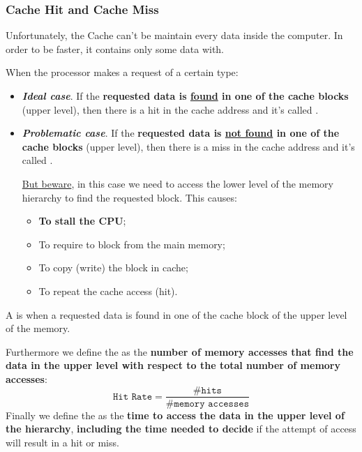\subsubsection{Cache Hit and Cache Miss}

Unfortunately, the Cache can't be maintain every data inside the computer. In order to be faster, it contains only some data with.

\highspace
When the processor makes a request of a certain type:
\begin{itemize}
    \item \textcolor{Green3}{\textbf{\emph{Ideal case}}}. If the \textbf{requested data is \underline{found} in one of the cache blocks} (upper level), then there is a hit in the cache address and it's called .

    \item \textcolor{Red2}{\textbf{\emph{Problematic case}}}. If the \textbf{requested data is \underline{not found} in one of the cache blocks} (upper level), then there is a miss in the cache address and it's called .

    \underline{But beware}, in this case we need to access the lower level of the memory hierarchy to find the requested block. This causes:
    \begin{itemize}
        \item \textbf{To stall the CPU};
        \item To require to block from the main memory;
        \item To copy (write) the block in cache;
        \item To repeat the cache access (hit).
    \end{itemize}
\end{itemize}

\begin{definitionbox}\label{definition: Cache Hit}
    A  is when a requested data is found in one of the cache block of the upper level of the memory.
\end{definitionbox}

\noindent
Furthermore we define the  as the \textbf{number of memory accesses that find the data in the upper level with respect to the total number of memory accesses}:
\begin{equation*}
    \texttt{Hit Rate} = \dfrac{\texttt{\# hits}}{\texttt{\# memory accesses}}
\end{equation*}
Finally we define the  as the \textbf{time to access the data in the upper level of the hierarchy}, \textbf{including the time needed to decide} if the attempt of access will result in a hit or miss.


